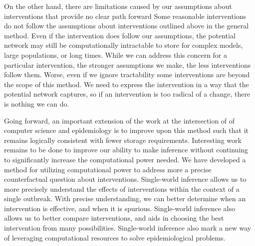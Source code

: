 \documentclass[PTRSB]{rsos}
\begin{document}
\begin{multicols}{2}
On the other hand, there are limitations caused by our assumptions about interventions that provide no clear path forward
Some reasonable interventions do not follow the assumptions about interventions outlined above in the general method.
Even if the intervention does follow our assumptions, the potential network may still be computationally intractable to store for complex models, large populations, or long times.
While we can address this concern for a particular intervention, the stronger assumptions we make, the less interventions follow them.
Worse, even if we ignore tractability some interventions are beyond the scope of this method.
We need to express the intervention in a way that the potential network captures, so if an intervention is too radical of a change, there is nothing we can do.

Going forward, an important extension of the work at the intersection of of computer science and epidemiology is to improve upon this method such that it remains logically consistent with fewer storage requirements. 
Interesting work remains to be done to improve our ability to make inference without continuing to significantly increase the computational power needed.
We have developed a method for utilizing computational power to address more a precise counterfactual question about interventions. 
Single-world inference allows us to more precisely understand the effects of interventions within the context of a single outbreak. 
With precise understanding, we can better determine when an intervention is effective, and when it is spurious.
Single-world inference also allows us to better compare interventions, and aids in choosing the best intervention from many possibilities. 
Single-world inference also mark a new way of leveraging computational resources to solve epidemiological problems.

\enlargethispage{20pt}






\end{multicols}


\begin{multicols}{3}

\end{multicols}
\end{document}
